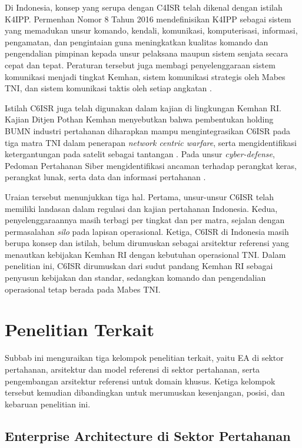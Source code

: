 Di Indonesia, konsep yang serupa dengan C4ISR telah dikenal dengan istilah K4IPP. Permenhan Nomor 8 Tahun 2016 mendefinisikan K4IPP sebagai sistem yang memadukan unsur komando, kendali, komunikasi, komputerisasi, informasi, pengamatan, dan pengintaian guna meningkatkan kualitas komando dan pengendalian pimpinan kepada unsur pelaksana maupun sistem senjata secara cepat dan tepat. Peraturan tersebut juga membagi penyelenggaraan sistem komunikasi menjadi tingkat Kemhan, sistem komunikasi strategis oleh Mabes TNI, dan sistem komunikasi taktis oleh setiap angkatan \cite{Permenhan8Tahun2016}.

Istilah C6ISR juga telah digunakan dalam kajian di lingkungan Kemhan RI. Kajian Ditjen\label{sk:Ditjen} Pothan\label{sk:Pothan} Kemhan menyebutkan bahwa pembentukan holding BUMN\label{sk:BUMN} industri pertahanan diharapkan mampu mengintegrasikan C6ISR pada tiga matra TNI dalam penerapan \textit{network centric warfare}, serta mengidentifikasi ketergantungan pada satelit sebagai tantangan \cite{Dwipratama2023}. Pada unsur \textit{cyber-defense}, Pedoman Pertahanan Siber mengidentifikasi ancaman terhadap perangkat keras, perangkat lunak, serta data dan informasi pertahanan \cite{Permenhan82Tahun2014}.

Uraian tersebut menunjukkan tiga hal. Pertama, unsur-unsur C6ISR telah memiliki landasan dalam regulasi dan kajian pertahanan Indonesia. Kedua, penyelenggaraannya masih terbagi per tingkat dan per matra, sejalan dengan permasalahan \textit{silo} pada lapisan operasional. Ketiga, C6ISR di Indonesia masih berupa konsep dan istilah, belum dirumuskan sebagai arsitektur referensi yang menautkan kebijakan Kemhan RI dengan kebutuhan operasional TNI. Dalam penelitian ini, C6ISR dirumuskan dari sudut pandang Kemhan RI sebagai penyusun kebijakan dan standar, sedangkan komando dan pengendalian operasional tetap berada pada Mabes TNI.

\section{Penelitian Terkait}
\label{sec:II.8}

Subbab ini menguraikan tiga kelompok penelitian terkait, yaitu EA di sektor pertahanan, arsitektur dan model referensi di sektor pertahanan, serta pengembangan arsitektur referensi untuk domain khusus. Ketiga kelompok tersebut kemudian dibandingkan untuk merumuskan kesenjangan, posisi, dan kebaruan penelitian ini.

\subsection{Enterprise Architecture di Sektor Pertahanan}
\label{sec:II.8.1}


